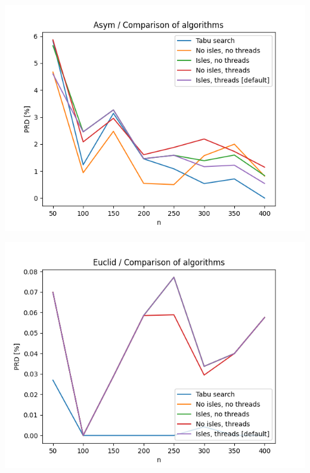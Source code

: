 \documentclass{article}
\begin{document}
\begin{center}
\includegraphics[width=\textwidth, 
                   height = 0.4\textheight, 
                   keepaspectratio]
                  {plots/asym_1_comparison} 
\end{center}

\begin{center}
\includegraphics[width=\textwidth, 
                   height = 0.4\textheight, 
                   keepaspectratio]
                  {plots/euclid_1_comparison} 
\end{center}
\end{document}
